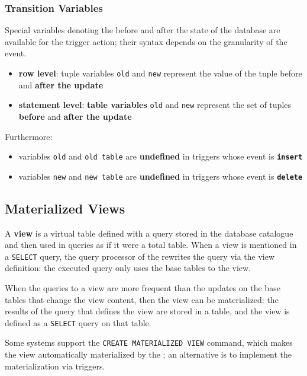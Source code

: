 \documentclass[english]{article}
\begin{document}
\subsubsection{Transition Variables}

Special variables denoting the before and after the state of the database are available for the trigger action;
their syntax depends on the granularity of the event.

\begin{itemize}
  \item \textbf{row level}: tuple variables \texttt{old} and \texttt{new} represent the value of the tuple before and \textbf{after the update}
  \item \textbf{statement level}: \textbf{table variables} \texttt{old} and \texttt{new} represent the set of tuples \textbf{before} and \textbf{after the update}
\end{itemize}

Furthermore:

\begin{itemize}
  \item variables \texttt{old} and \texttt{old table} are \textbf{undefined} in triggers whose event is \textbf{\texttt{insert}}
  \item variables \texttt{new} and \texttt{new table} are \textbf{undefined} in triggers whose event is \textbf{\texttt{delete}}
\end{itemize}

\subsection{Materialized Views}

A \textbf{view} is a virtual table defined with a query stored in the database catalogue and then used in queries as if it were a total table.
When a view is mentioned in a \texttt{SELECT} query, the query processor of the \dbms rewrites the query via the view definition:
the executed query only uses the base tables to the view.

When the queries to a view are more frequent than the updates on the base tables that change the view content, then the view can be materialized:
the results of the query that defines the view are stored in a table, and the view is defined as a \texttt{SELECT} query on that table.

Some systems support the \texttt{CREATE MATERIALIZED VIEW} command, which makes the view automatically materialized by the \dbms;
an alternative is to implement the materialization via triggers.
\end{document}
